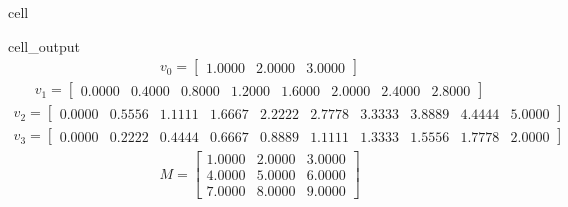 \documentclass[letterpaper,10pt,english]{jupyterBook}
\begin{document}
\begin{sphinxuseclass}{cell}
\begin{sphinxVerbatimOutput}
\begin{sphinxuseclass}{cell_output}\begin{equation*}
\begin{split}\displaystyle v_0=\left[
\begin{array}{}
  1.0000 &  2.0000 &  3.0000
\end{array}
\right]\end{split}
\end{equation*}\begin{equation*}
\begin{split}\displaystyle v_1=\left[
\begin{array}{}
  0.0000 &  0.4000 &  0.8000 &  1.2000 &  1.6000 &  2.0000 &  2.4000 &  2.8000
\end{array}
\right]\end{split}
\end{equation*}\begin{equation*}
\begin{split}\displaystyle v_2=\left[
\begin{array}{}
  0.0000 &  0.5556 &  1.1111 &  1.6667 &  2.2222 &  2.7778 &  3.3333 &  3.8889 &  4.4444 &  5.0000
\end{array}
\right]\end{split}
\end{equation*}\begin{equation*}
\begin{split}\displaystyle v_3=\left[
\begin{array}{}
  0.0000 &  0.2222 &  0.4444 &  0.6667 &  0.8889 &  1.1111 &  1.3333 &  1.5556 &  1.7778 &  2.0000
\end{array}
\right]\end{split}
\end{equation*}\begin{equation*}
\begin{split}\displaystyle M=\left[
\begin{array}{}
  1.0000 &  2.0000 &  3.0000\\
  4.0000 &  5.0000 &  6.0000\\
  7.0000 &  8.0000 &  9.0000
\end{array}
\right]\end{split}
\end{equation*}
\end{sphinxuseclass}\end{sphinxVerbatimOutput}

\end{sphinxuseclass}
\end{document}
